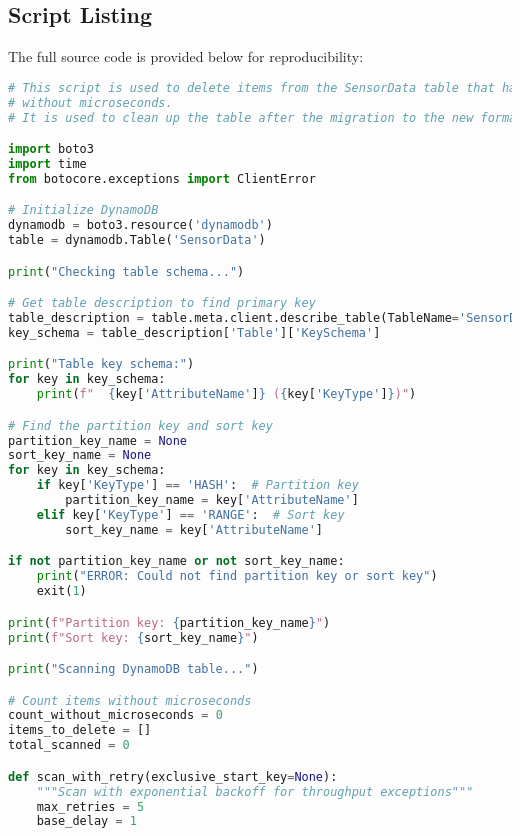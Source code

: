 \subsection{Script Listing}
The full source code is provided below for reproducibility:
\begin{lstlisting}[language=Python]
# This script is used to delete items from the SensorData table that have a timestamp 
# without microseconds.
# It is used to clean up the table after the migration to the new format.

import boto3
import time
from botocore.exceptions import ClientError

# Initialize DynamoDB
dynamodb = boto3.resource('dynamodb')
table = dynamodb.Table('SensorData')

print("Checking table schema...")

# Get table description to find primary key
table_description = table.meta.client.describe_table(TableName='SensorData')
key_schema = table_description['Table']['KeySchema']

print("Table key schema:")
for key in key_schema:
    print(f"  {key['AttributeName']} ({key['KeyType']})")

# Find the partition key and sort key
partition_key_name = None
sort_key_name = None
for key in key_schema:
    if key['KeyType'] == 'HASH':  # Partition key
        partition_key_name = key['AttributeName']
    elif key['KeyType'] == 'RANGE':  # Sort key
        sort_key_name = key['AttributeName']

if not partition_key_name or not sort_key_name:
    print("ERROR: Could not find partition key or sort key")
    exit(1)

print(f"Partition key: {partition_key_name}")
print(f"Sort key: {sort_key_name}")

print("Scanning DynamoDB table...")

# Count items without microseconds
count_without_microseconds = 0
items_to_delete = []
total_scanned = 0

def scan_with_retry(exclusive_start_key=None):
    """Scan with exponential backoff for throughput exceptions"""
    max_retries = 5
    base_delay = 1
    

\end{lstlisting}
